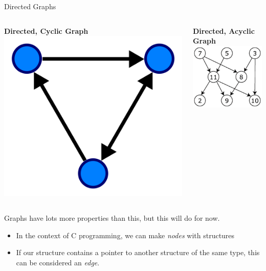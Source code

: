 \documentclass[11pt]{beamer}
\begin{document}
\begin{frame}{Directed Graphs}
\begin{columns}
\begin{column}{0.5\textwidth}
\center
\textbf{Directed, Cyclic Graph}
\includegraphics[scale=0.1]{directed.png}
\end{column}
\begin{column}{0.5\textwidth}
\center
\textbf{Directed, Acyclic Graph}
\includegraphics[scale=0.4]{directedAcyclic.png}
\end{column}
\end{columns}
Graphs have lots more properties than this, but this will do for now.
\begin{itemize}
\item In the context of C programming, we can make \emph{nodes} with structures
\item If our structure contains a pointer to another structure of the same type, this can be considered an \emph{edge}.  
\end{itemize}
\end{frame}
\end{document}
